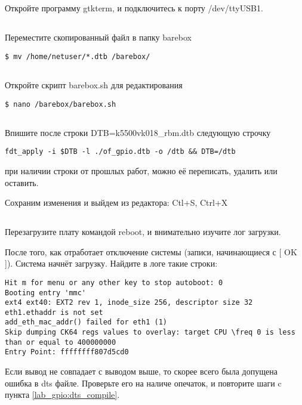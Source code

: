 \subsection{}Откройте программу gtkterm, и подключитесь к порту /dev/ttyUSB1.

\subsection{}Переместите скопированный файл в папку barebox
\begin{lstlisting}[style=bash]
$ mv /home/netuser/*.dtb /barebox/
\end{lstlisting}

\subsection{}Откройте скрипт barebox.sh для редактирования
\begin{lstlisting}[style=bash]
$ nano /barebox/barebox.sh
\end{lstlisting}

\subsection{}Впишите после строки DTB=k5500vk018\_rbm.dtb следующую строчку 
\begin{lstlisting}[style=stdout]
fdt_apply -i $DTB -l ./of_gpio.dtb -o /dtb && DTB=/dtb
\end{lstlisting}
при наличии строки от прошлых работ, можно её переписать, удалить или оставить.

Сохраним изменения и выйдем из редактора: Ctl+S,  Ctrl+X

\subsection{}Перезагрузите плату командой reboot, и внимательно изучите лог загрузки.

После того, как отработает отключение системы (записи, начинающиеся с [ OK ]). Система начнёт загрузку. Найдите в логе такие строки:
\begin{lstlisting}[style=stdout] 
Hit m for menu or any other key to stop autoboot: 0
Booting entry 'mmc'
ext4 ext40: EXT2 rev 1, inode_size 256, descriptor size 32
eth1.ethaddr is not set
add_eth_mac_addr() failed for eth1 (1)
Skip dumping CK64 regs values to overlay: target CPU \freq 0 is less than or equal to 400000000
Entry Point: ffffffff807d5cd0
\end{lstlisting}
Если вывод не совпадает с выводом выше, то скорее всего была допущена ошибка в dts файле. Проверьте его на наличе опечаток, и повторите шаги c пункта \ref{lab_gpio:dts_compile}.

